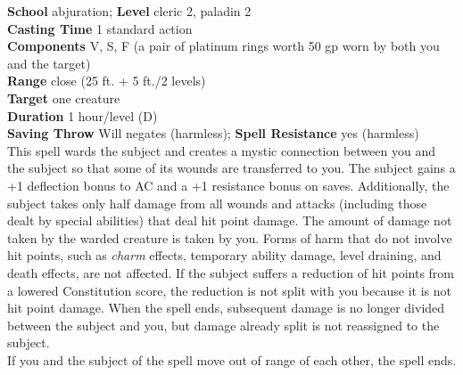 \textbf{School} abjuration; \textbf{Level} cleric 2, paladin 2\\
\textbf{Casting Time} 1 standard action\\
\textbf{Components} V, S, F (a pair of platinum rings worth 50 gp worn by both you and the target)\\
\textbf{Range} close (25 ft. + 5 ft./2 levels)\\
\textbf{Target} one creature\\
\textbf{Duration} 1 hour/level (D)\\
\textbf{Saving Throw }Will negates (harmless); \textbf{Spell Resistance} yes (harmless)\\
This spell wards the subject and creates a mystic connection between you and the subject so that some of its wounds are transferred to you. The subject gains a +1 deflection bonus to AC and a +1 resistance bonus on saves. Additionally, the subject takes only half damage from all wounds and attacks (including those dealt by special abilities) that deal hit point damage. The amount of damage not taken by the warded creature is taken by you. Forms of harm that do not involve hit points, such as \textit{charm }effects, temporary ability damage, level draining, and death effects, are not affected. If the subject suffers a reduction of hit points from a lowered Constitution score, the reduction is not split with you because it is not hit point damage. When the spell ends, subsequent damage is no longer divided between the subject and you, but damage already split is not reassigned to the subject.\\
If you and the subject of the spell move out of range of each other, the spell ends.\\
